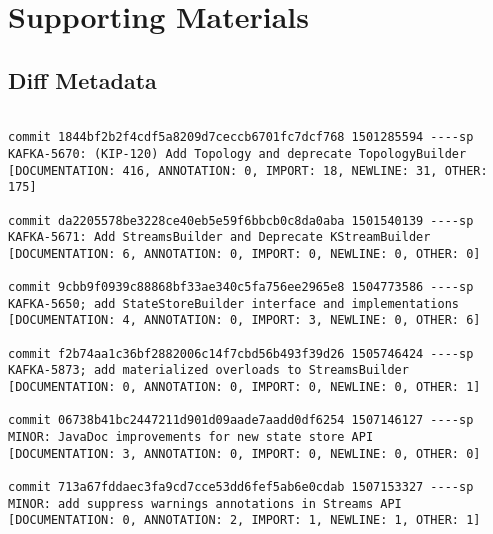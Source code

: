 \chapter{Supporting Materials}


\section{Diff Metadata}
\label{sec:Diff-Metadata}

\begin{mdframed}
\begin{lstlisting}[caption={The \emph{diff metadata}, as produced by the heuristics used in Intelligent History,
    for the commit history of \file{Topology.java} from the Apache Kafka repository.
    Ordered from the oldest commit to the most recent commit.}
]

commit 1844bf2b2f4cdf5a8209d7ceccb6701fc7dcf768 1501285594 ----sp 
KAFKA-5670: (KIP-120) Add Topology and deprecate TopologyBuilder                                     
[DOCUMENTATION: 416, ANNOTATION: 0, IMPORT: 18, NEWLINE: 31, OTHER: 175]

commit da2205578be3228ce40eb5e59f6bbcb0c8da0aba 1501540139 ----sp 
KAFKA-5671: Add StreamsBuilder and Deprecate KStreamBuilder                                          
[DOCUMENTATION: 6, ANNOTATION: 0, IMPORT: 0, NEWLINE: 0, OTHER: 0]

commit 9cbb9f0939c88868bf33ae340c5fa756ee2965e8 1504773586 ----sp 
KAFKA-5650; add StateStoreBuilder interface and implementations                                      
[DOCUMENTATION: 4, ANNOTATION: 0, IMPORT: 3, NEWLINE: 0, OTHER: 6]

commit f2b74aa1c36bf2882006c14f7cbd56b493f39d26 1505746424 ----sp 
KAFKA-5873; add materialized overloads to StreamsBuilder                                             
[DOCUMENTATION: 0, ANNOTATION: 0, IMPORT: 0, NEWLINE: 0, OTHER: 1]

commit 06738b41bc2447211d901d09aade7aadd0df6254 1507146127 ----sp 
MINOR: JavaDoc improvements for new state store API                                                  
[DOCUMENTATION: 3, ANNOTATION: 0, IMPORT: 0, NEWLINE: 0, OTHER: 0]

commit 713a67fddaec3fa9cd7cce53dd6fef5ab6e0cdab 1507153327 ----sp 
MINOR: add suppress warnings annotations in Streams API                                              
[DOCUMENTATION: 0, ANNOTATION: 2, IMPORT: 1, NEWLINE: 1, OTHER: 1]


\end{lstlisting}
\end{mdframed}

